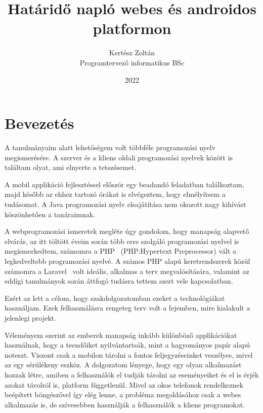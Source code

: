 \documentclass[
]{thesis-ekf}
\theoremstyle{definition}
\theoremstyle{remark}
\begin{document}
\title{Határidő napló webes és androidos platformon}
\author{Kertész Zoltán\\Programtervező informatikus BSc}
\date{2022}
\maketitle
\tableofcontents

\chapter*{Bevezetés}
A tanulmányaim alatt lehetőségem volt többféle programozási nyelv megismerésére. A szerver és a kliens oldali programozási nyelvek között is találtam olyat, ami elnyerte a tetszésemet. 

A mobil applikáció fejlesztéssel először egy beadandó feladatban találkoztam, majd később az ehhez tartozó órákat is elvégeztem, hogy elmélyítsem a tudásomat. A Java programozási nyelv elsajátítása nem okozott nagy kihívást köszönhetően a tanáraimnak. 

A webprogramozási ismeretek megléte úgy gondolom, hogy manapság alapvető elvárás, az itt töltött éveim során több erre szolgáló programozási nyelvel is megismerkedtem, számomra a PHP~\cite{php_doc} (PHP:Hypertext Preprocessor) vált a legkedveltebb programozási nyelvé. A számos PHP alapú keretrendszerek közül számomra a Laravel~\cite{laravel_main} volt ideális, alkalmas a terv megvalósítására, valamint az eddigi tanulmányok során áttfogó tudásra tettem szert vele kapcsolatban.

Ezért az lett a célom, hogy szakdolgozatomban ezeket a technológiákat használjam. Ezek felhasználásra rengeteg terv volt a fejemben, mire kialakult a jelenlegi projekt.

Véleményem szerint az emberek manapság inkább különböző applikációkat használnak, hogy a teendőiket nyilvántartsák, mint a hagyományos papír alapú noteszt. Viszont csak a mobilon tárolni a fontos feljegyzéseinket veszélyes, mivel az egy sérülékeny eszköz. A dolgozatom lényege, hogy egy olyan alkalmazást hozzak létre, amiben a felhasználók el tudják tárolni az eseményeiket és el is érjék azokat távolról is, platform függetlenül. Mivel az okos telefonok rendelkeznek beépített böngészővel így elég lenne, a probléma megoldásához csak a webes alkalmazás is, de szívesebben használják a felhasználók a kliens programokat. 
\end{document}
